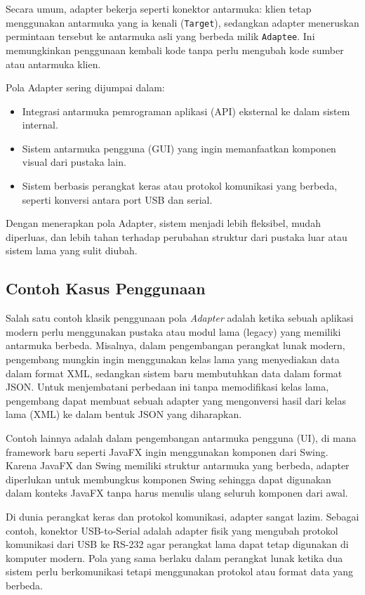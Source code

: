 Secara umum, adapter bekerja seperti konektor antarmuka: klien tetap menggunakan antarmuka yang ia kenali (\texttt{Target}), sedangkan adapter meneruskan permintaan tersebut ke antarmuka asli yang berbeda milik \texttt{Adaptee}. Ini memungkinkan penggunaan kembali kode tanpa perlu mengubah kode sumber atau antarmuka klien.

Pola Adapter sering dijumpai dalam:
\begin{itemize}
	\item Integrasi antarmuka pemrograman aplikasi (API) eksternal ke dalam sistem internal.
	\item Sistem antarmuka pengguna (GUI) yang ingin memanfaatkan komponen visual dari pustaka lain.
	\item Sistem berbasis perangkat keras atau protokol komunikasi yang berbeda, seperti konversi antara port USB dan serial.
\end{itemize}

Dengan menerapkan pola Adapter, sistem menjadi lebih fleksibel, mudah diperluas, dan lebih tahan terhadap perubahan struktur dari pustaka luar atau sistem lama yang sulit diubah.

\subsection{Contoh Kasus Penggunaan}

Salah satu contoh klasik penggunaan pola \textit{Adapter} adalah ketika sebuah aplikasi modern perlu menggunakan pustaka atau modul lama (legacy) yang memiliki antarmuka berbeda. Misalnya, dalam pengembangan perangkat lunak modern, pengembang mungkin ingin menggunakan kelas lama yang menyediakan data dalam format XML, sedangkan sistem baru membutuhkan data dalam format JSON. Untuk menjembatani perbedaan ini tanpa memodifikasi kelas lama, pengembang dapat membuat sebuah adapter yang mengonversi hasil dari kelas lama (XML) ke dalam bentuk JSON yang diharapkan.

Contoh lainnya adalah dalam pengembangan antarmuka pengguna (UI), di mana framework baru seperti JavaFX ingin menggunakan komponen dari Swing. Karena JavaFX dan Swing memiliki struktur antarmuka yang berbeda, adapter diperlukan untuk membungkus komponen Swing sehingga dapat digunakan dalam konteks JavaFX tanpa harus menulis ulang seluruh komponen dari awal.

Di dunia perangkat keras dan protokol komunikasi, adapter sangat lazim. Sebagai contoh, konektor USB-to-Serial adalah adapter fisik yang mengubah protokol komunikasi dari USB ke RS-232 agar perangkat lama dapat tetap digunakan di komputer modern. Pola yang sama berlaku dalam perangkat lunak ketika dua sistem perlu berkomunikasi tetapi menggunakan protokol atau format data yang berbeda.

